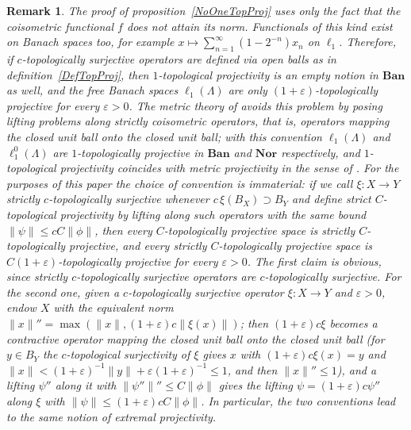 \documentclass[12pt]{article}
\newtheorem{remark}[theorem]{Remark}
\newcommand{\Nor}{\mathbf{Nor}}
\newcommand{\Ban}{\mathbf{Ban}}
\newcommand{\lo}[1]{\ell_1^0(#1)}
\newcommand{\ellone}[1]{\ell_1(#1)}
\newcommand{\norm}[1]{\lVert #1\rVert}
\begin{document}
\begin{remark}\label{RemarkStrictConvention} The proof of
    proposition~\ref{NoOneTopProj} uses only the fact that the coisometric
    functional $f$ does not attain its norm. Functionals of this kind exist on
    Banach spaces too, for example $x\mapsto\sum_{n=1}^\infty(1-2^{-n})x_n$ on
    $\ell_1$. Therefore, if $c$-topologically surjective operators are defined
    via open balls as in definition~\ref{DefTopProj}, then $1$-topological
    projectivity is an empty notion in $\Ban$ as well, and the free Banach
    spaces $\ellone{\Lambda}$ are only $(1+\varepsilon)$-topologically projective
    for every $\varepsilon>0$. The metric theory of \cite{HelMetrFrQMod} avoids
    this problem by posing lifting problems along strictly coisometric
    operators, that is, operators mapping the closed unit ball onto the closed
    unit ball; with this convention $\ellone{\Lambda}$ and $\lo{\Lambda}$ are
    $1$-topologically projective in $\Ban$ and $\Nor$ respectively, and
    $1$-topological projectivity coincides with metric projectivity in the
    sense of \cite{HelMetrFrQMod}. For the purposes of this paper
    the choice of convention is immaterial: if we call $\xi:X\to Y$ strictly
    $c$-topologically surjective whenever $c\,\xi(B_X)\supset B_Y$ and define
    strict $C$-topological projectivity by lifting along such operators with
    the same bound $\norm{\psi}\leq cC\norm{\phi}$, then every
    $C$-topologically projective space is strictly $C$-topologically projective,
    and every strictly $C$-topologically projective space is
    $C(1+\varepsilon)$-topologically projective for every $\varepsilon>0$. The
    first claim is obvious, since strictly $c$-topologically surjective
    operators are $c$-topologically surjective. For the second one, given a
    $c$-topologically surjective operator $\xi:X\to Y$ and $\varepsilon>0$,
    endow $X$ with the equivalent norm
    $\norm{x}''=\max(\norm{x},(1+\varepsilon)c\norm{\xi(x)})$; then
    $(1+\varepsilon)c\xi$ becomes a contractive operator mapping the closed
    unit ball onto the closed unit ball (for $y\in B_Y$ the $c$-topological
    surjectivity of $\xi$ gives $x$ with $(1+\varepsilon)c\xi(x)=y$ and
    $\norm{x}<(1+\varepsilon)^{-1}\norm{y}+\varepsilon(1+\varepsilon)^{-1}\leq 1$,
    and then $\norm{x}''\leq 1$), and a lifting $\psi''$ along it with
    $\norm{\psi''}''\leq C\norm{\phi}$ gives the lifting
    $\psi=(1+\varepsilon)c\psi''$ along $\xi$ with
    $\norm{\psi}\leq(1+\varepsilon)cC\norm{\phi}$. In particular, the two
    conventions lead to the same notion of extremal projectivity.
\end{remark}
\end{document}
